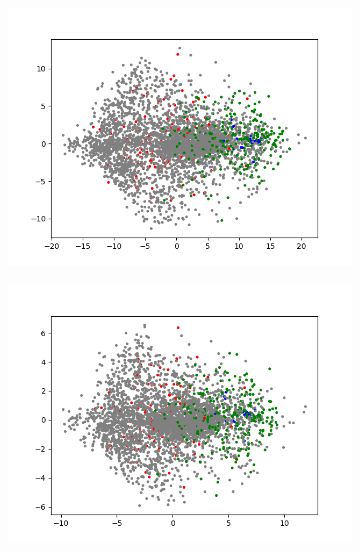 \begin{figure}[H]
\begin{subfigure}{.25\textwidth}
        \includegraphics[width=\textwidth]{images/figures/experiments_latent/convolutional_dim1024_PCA_classes.png}
    \end{subfigure}%
    \begin{subfigure}{.25\textwidth}
        \centering
        \includegraphics[width=\textwidth]{images/figures/experiments_latent/convolutional_dim50_PCA_classes.png}
    \end{subfigure}
    \begin{subfigure}{.25\textwidth}
        \centering

\end{subfigure}
\end{figure}
